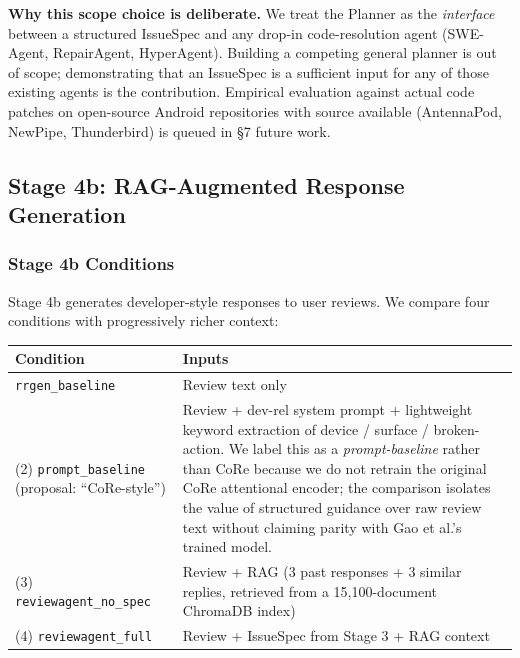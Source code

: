\documentclass[sigconf, nonacm, anonymous, balance=false]{acmart}
\begin{document}
\textbf{Why this scope choice is deliberate.} We treat the Planner as the \emph{interface} between a structured IssueSpec and any drop-in code-resolution agent (SWE-Agent, RepairAgent, HyperAgent). Building a competing general planner is out of scope; demonstrating that an IssueSpec is a sufficient input for any of those existing agents is the contribution. Empirical evaluation against actual code patches on open-source Android repositories with source available (AntennaPod, NewPipe, Thunderbird) is queued in §7 future work.

\subsection{Stage 4b: RAG-Augmented Response Generation}\label{stage-4b-rag-augmented-response-generation}

\subsubsection{Stage 4b Conditions}\label{stage-4b-conditions}

Stage 4b generates developer-style responses to user reviews. We compare four conditions with progressively richer context:

\begin{table}[t]
\centering
\footnotesize
\setlength{\tabcolsep}{2pt}
\begin{tabular}{@{}
  >{\raggedright\arraybackslash}p{}
  >{\raggedright\arraybackslash}p{}@{}}
\toprule
Condition
 & Inputs
 \\
\midrule\bottomrule(1) \texttt{rrgen\_baseline} & Review text only \\
(2) \texttt{prompt\_baseline} (proposal: ``CoRe-style'') & Review + dev-rel system prompt + lightweight keyword extraction of device / surface / broken-action. We label this as a \emph{prompt-baseline} rather than CoRe \cite{gao2020core} because we do not retrain the original CoRe attentional encoder; the comparison isolates the value of structured guidance over raw review text without claiming parity with Gao et al.'s trained model. \\
(3) \texttt{reviewagent\_no\_spec} & Review + RAG (3 past responses + 3 similar replies, retrieved from a 15,100-document ChromaDB index) \\
(4) \texttt{reviewagent\_full} & Review + IssueSpec from Stage 3 + RAG context \\
\end{tabular}
\end{table}
\end{document}

